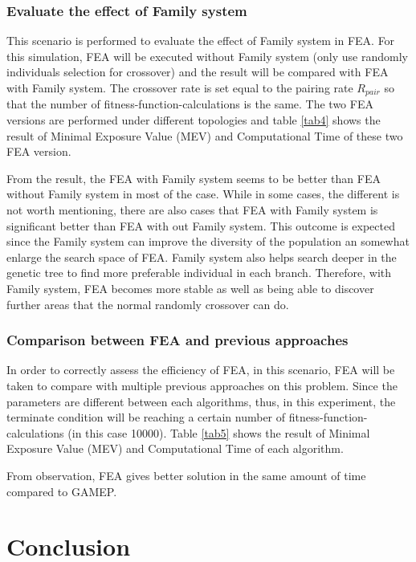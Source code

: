 \documentclass[final]{elsarticle}
\begin{document}
\subsubsection{Evaluate the effect of Family system}
This scenario is performed to evaluate the effect of Family system in FEA. For this simulation, FEA will be executed without Family system (only use randomly individuals selection for crossover) and the result will be compared with FEA with Family system. The crossover rate is set equal to the pairing rate $R_{pair}$ so that the number of fitness-function-calculations is the same. The two FEA versions are performed under different topologies and table \ref{tab4} shows the result of Minimal Exposure Value (MEV) and Computational Time of these two FEA version.

From the result, the FEA with Family system seems to be better than FEA without Family system in most of the case. While in some cases, the different is not worth mentioning, there are also cases that FEA with Family system is significant better than FEA with out Family system. This outcome is expected since the Family system can improve the diversity of the population an somewhat enlarge the search space of FEA. Family system also helps search deeper in the genetic tree to find more preferable individual in each branch. Therefore, with Family system, FEA becomes more stable as well as being able to discover further areas that the normal randomly crossover can do. 

\subsubsection{Comparison between FEA and previous approaches}
In order to correctly assess the efficiency of FEA, in this scenario, FEA will be taken to compare with multiple previous approaches on this problem. Since the parameters are different between each algorithms, thus, in this experiment, the terminate condition will be reaching a certain number of fitness-function-calculations (in this case 10000).  Table \ref{tab5} shows the result of Minimal Exposure Value (MEV) and Computational Time of each algorithm.

From observation, FEA gives better solution in the same amount of time compared to GAMEP. 

\section{Conclusion}

\begin{landscape}

\end{landscape}

\end{document}
